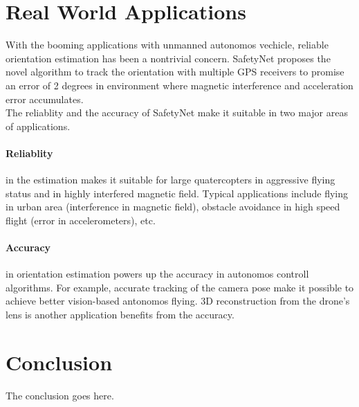\documentclass[journal,onecolumn]{IEEEtran}
\begin{document}
\section{Real World Applications}
With the booming applications with unmanned autonomos vechicle, reliable orientation
estimation has been a nontrivial concern. SafetyNet proposes the novel algorithm
to track the orientation with multiple GPS receivers to promise an error of 2 degrees
in environment where magnetic interference and acceleration error accumulates.\\
The reliablity and the accuracy of SafetyNet make it suitable in two major areas of
applications.\\
\paragraph{Reliablity} in the estimation makes it suitable for large quatercopters in aggressive
flying status and in highly interfered magnetic field. Typical applications include
flying in urban area (interference in magnetic field), obstacle avoidance in high
speed flight (error in accelerometers), etc. \\
\paragraph{Accuracy} in orientation estimation powers up the accuracy in
autonomos controll algorithms. For example, accurate tracking of the camera pose make it possible
to achieve better vision-based antonomos flying. 3D reconstruction from the drone's
lens is another application benefits from the accuracy.

\section{Conclusion}
The conclusion goes here.





\end{document}
